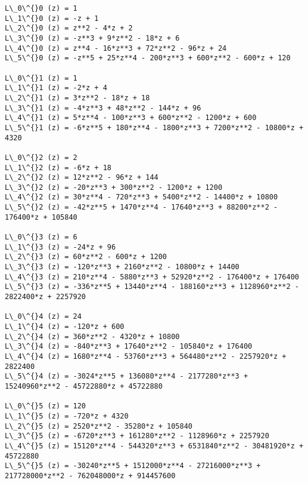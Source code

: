 \documentclass[11pt]{article}
\begin{document}
    \begin{Verbatim}[commandchars=\\\{\}]
L\_0\^{}0 (z) = 1
L\_1\^{}0 (z) = -z + 1
L\_2\^{}0 (z) = z**2 - 4*z + 2
L\_3\^{}0 (z) = -z**3 + 9*z**2 - 18*z + 6
L\_4\^{}0 (z) = z**4 - 16*z**3 + 72*z**2 - 96*z + 24
L\_5\^{}0 (z) = -z**5 + 25*z**4 - 200*z**3 + 600*z**2 - 600*z + 120

L\_0\^{}1 (z) = 1
L\_1\^{}1 (z) = -2*z + 4
L\_2\^{}1 (z) = 3*z**2 - 18*z + 18
L\_3\^{}1 (z) = -4*z**3 + 48*z**2 - 144*z + 96
L\_4\^{}1 (z) = 5*z**4 - 100*z**3 + 600*z**2 - 1200*z + 600
L\_5\^{}1 (z) = -6*z**5 + 180*z**4 - 1800*z**3 + 7200*z**2 - 10800*z + 4320

L\_0\^{}2 (z) = 2
L\_1\^{}2 (z) = -6*z + 18
L\_2\^{}2 (z) = 12*z**2 - 96*z + 144
L\_3\^{}2 (z) = -20*z**3 + 300*z**2 - 1200*z + 1200
L\_4\^{}2 (z) = 30*z**4 - 720*z**3 + 5400*z**2 - 14400*z + 10800
L\_5\^{}2 (z) = -42*z**5 + 1470*z**4 - 17640*z**3 + 88200*z**2 - 176400*z + 105840

L\_0\^{}3 (z) = 6
L\_1\^{}3 (z) = -24*z + 96
L\_2\^{}3 (z) = 60*z**2 - 600*z + 1200
L\_3\^{}3 (z) = -120*z**3 + 2160*z**2 - 10800*z + 14400
L\_4\^{}3 (z) = 210*z**4 - 5880*z**3 + 52920*z**2 - 176400*z + 176400
L\_5\^{}3 (z) = -336*z**5 + 13440*z**4 - 188160*z**3 + 1128960*z**2 - 2822400*z + 2257920

L\_0\^{}4 (z) = 24
L\_1\^{}4 (z) = -120*z + 600
L\_2\^{}4 (z) = 360*z**2 - 4320*z + 10800
L\_3\^{}4 (z) = -840*z**3 + 17640*z**2 - 105840*z + 176400
L\_4\^{}4 (z) = 1680*z**4 - 53760*z**3 + 564480*z**2 - 2257920*z + 2822400
L\_5\^{}4 (z) = -3024*z**5 + 136080*z**4 - 2177280*z**3 + 15240960*z**2 - 45722880*z + 45722880

L\_0\^{}5 (z) = 120
L\_1\^{}5 (z) = -720*z + 4320
L\_2\^{}5 (z) = 2520*z**2 - 35280*z + 105840
L\_3\^{}5 (z) = -6720*z**3 + 161280*z**2 - 1128960*z + 2257920
L\_4\^{}5 (z) = 15120*z**4 - 544320*z**3 + 6531840*z**2 - 30481920*z + 45722880
L\_5\^{}5 (z) = -30240*z**5 + 1512000*z**4 - 27216000*z**3 + 217728000*z**2 - 762048000*z + 914457600


    \end{Verbatim}
\end{document}
